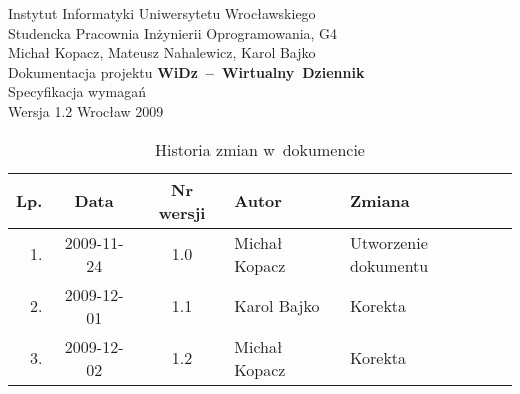 \documentclass[12pt,leqno,twoside]{mwart}
\begin{document}
\begin{titlepage}
\begin{center}
Instytut Informatyki Uniwersytetu Wrocławskiego \\
Studencka Pracownia Inżynierii Oprogramowania, G4 \\
\vspace{4cm}
\Large Michał Kopacz, Mateusz Nahalewicz, Karol Bajko \\
\vspace{0.5cm}
\huge Dokumentacja projektu \mbox{\textbf{WiDz -- Wirtualny Dziennik}} \\ \Large Specyfikacja wymagań\\
\vspace{1cm}
\normalsize Wersja 1.2
\vfill
\normalsize Wrocław 2009
\end{center}
\end{titlepage}

\newpage

\begin{table}
	\centering
	\caption{Historia zmian w~dokumencie}
		\begin{tabular}{|r|c|c|l|l|}
		\hline
		Lp. 	& Data       & Nr wersji 	& Autor           		& Zmiana \\ \hline
		1.   	& 2009-11-24 & 1.0       	& Michał Kopacz & Utworzenie dokumentu \\ \hline
		2.	& 2009-12-01 & 1.1			& Karol Bajko & Korekta	\\ \hline
		3.	& 2009-12-02 & 1.2			& Michał Kopacz & Korekta	\\ \hline
		\end{tabular}
\end{table}

\newpage

\tableofcontents

\newpage
\end{document}
